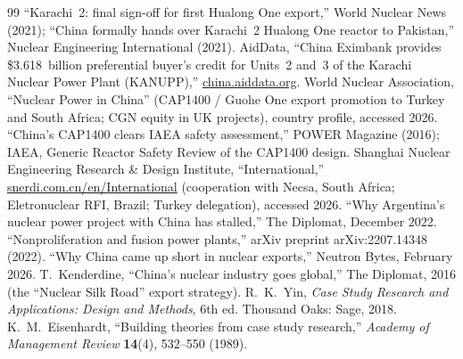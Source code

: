 \documentclass[11pt]{article}
\newcommand{\jl}[2]{\href{#2}{#1}}
\begin{document}
\begin{thebibliography}{99}
 ``Karachi~2: final sign-off for first Hualong One export,'' World Nuclear News (2021); ``China formally hands over Karachi~2 Hualong One reactor to Pakistan,'' Nuclear Engineering International (2021).
 AidData, ``China Eximbank provides \$3.618~billion preferential buyer's credit for Units~2 and~3 of the Karachi Nuclear Power Plant (KANUPP),'' \jl{china.aiddata.org}{https://china.aiddata.org/projects/41918/}.
 World Nuclear Association, ``Nuclear Power in China'' (CAP1400 / Guohe One export promotion to Turkey and South Africa; CGN equity in UK projects), country profile, accessed 2026.
 ``China's CAP1400 clears IAEA safety assessment,'' POWER Magazine (2016); IAEA, Generic Reactor Safety Review of the CAP1400 design.
 Shanghai Nuclear Engineering Research \& Design Institute, ``International,'' \jl{snerdi.com.cn/en/International}{https://www.snerdi.com.cn/en/International} (cooperation with Necsa, South Africa; Eletronuclear RFI, Brazil; Turkey delegation), accessed 2026.
 ``Why Argentina's nuclear power project with China has stalled,'' The Diplomat, December 2022.
 ``Nonproliferation and fusion power plants,'' arXiv preprint arXiv:2207.14348 (2022).
 ``Why China came up short in nuclear exports,'' Neutron Bytes, February 2026.
 T.~Kenderdine, ``China's nuclear industry goes global,'' The Diplomat, 2016 (the ``Nuclear Silk Road'' export strategy).
 R.~K.~Yin, \emph{Case Study Research and Applications: Design and Methods}, 6th ed. Thousand Oaks: Sage, 2018.
 K.~M.~Eisenhardt, ``Building theories from case study research,'' \emph{Academy of Management Review} \textbf{14}(4), 532--550 (1989).

\end{thebibliography}
\end{document}
